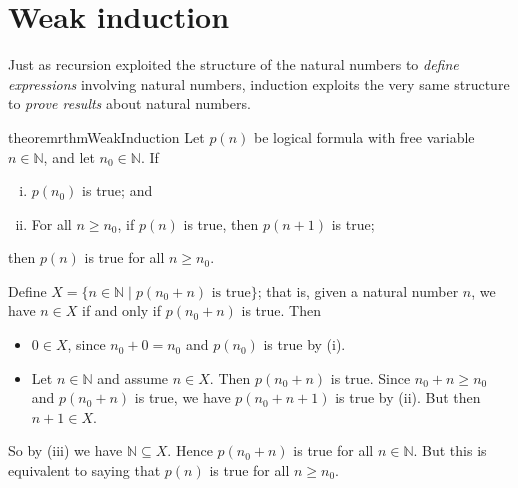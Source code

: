 \section{Weak induction}

Just as recursion exploited the structure of the natural numbers to \textit{define expressions} involving natural numbers, induction exploits the very same structure to \textit{prove results} about natural numbers.

\begin{restatable}{theorem}{rthmWeakInduction}
\label{thmWeakInduction}
Let $p(n)$ be logical formula with free variable $n \in \mathbb{N}$, and let $n_0 \in \mathbb{N}$. If
\begin{enumerate}[(i)] 
\item $p(n_0)$ is true; and
\item For all $n \ge n_0$, if $p(n)$ is true, then $p(n+1)$ is true;
\end{enumerate}
then $p(n)$ is true for all $n \ge n_0$.
\end{restatable}

\begin{cproof}
Define $X = \{ n \in \mathbb{N} \mid p(n_0 + n) \text{ is true} \}$; that is, given a natural number $n$, we have $n \in X$ if and only if $p(n_0 + n)$ is true. Then
\begin{itemize}
\item $0 \in X$, since $n_0 + 0 = n_0$ and $p(n_0)$ is true by (i).
\item Let $n \in \mathbb{N}$ and assume $n \in X$. Then $p(n_0+n)$ is true. Since $n_0 + n \ge n_0$ and $p(n_0+n)$ is true, we have $p(n_0+n+1)$ is true by (ii). But then $n+1 \in X$.
\end{itemize}

So by (iii) we have $\mathbb{N} \subseteq X$. Hence $p(n_0 + n)$ is true for all $n \in \mathbb{N}$. But this is equivalent to saying that $p(n)$ is true for all $n \ge n_0$.
\end{cproof}

